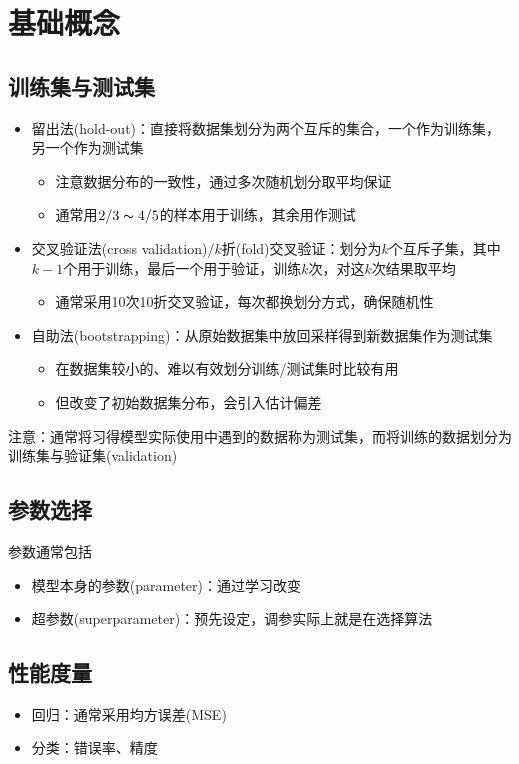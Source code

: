 
\section{基础概念}
\subsection{训练集与测试集}
\begin{itemize}
	\item 留出法(hold-out)：直接将数据集划分为两个互斥的集合，一个作为训练集，另一个作为测试集
	\begin{itemize}
		\item 注意数据分布的一致性，通过多次随机划分取平均保证
		\item 通常用$2/3\thicksim 4/5$的样本用于训练，其余用作测试
	\end{itemize}
	\item 交叉验证法(cross validation)/$k$折(fold)交叉验证：划分为$k$个互斥子集，其中$k-1$个用于训练，最后一个用于验证，训练$k$次，对这$k$次结果取平均
	\begin{itemize}
		\item 通常采用10次10折交叉验证，每次都换划分方式，确保随机性
	\end{itemize}
	\item 自助法(bootstrapping)：从原始数据集中放回采样得到新数据集作为测试集
	\begin{itemize}
		\item 在数据集较小的、难以有效划分训练/测试集时比较有用
		\item 但改变了初始数据集分布，会引入估计偏差
	\end{itemize}
\end{itemize}

注意：通常将习得模型实际使用中遇到的数据称为测试集，而将训练的数据划分为训练集与验证集(validation)

\subsection{参数选择}
参数通常包括
\begin{itemize}
	\item 模型本身的参数(parameter)：通过学习改变
	\item 超参数(superparameter)：预先设定，调参实际上就是在选择算法
\end{itemize}

\subsection{性能度量}
\begin{itemize}
\item 回归：通常采用均方误差(MSE)
\item 分类：错误率、精度
\end{itemize}

